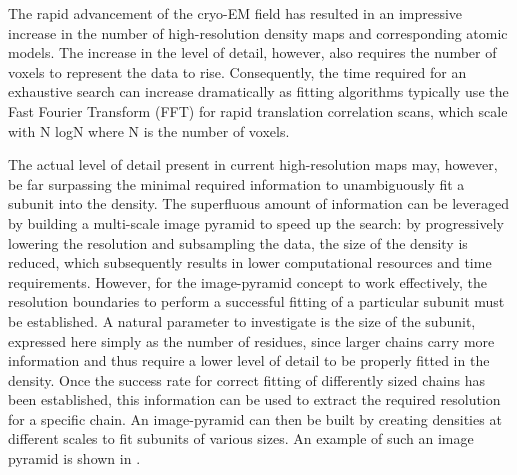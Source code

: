 The rapid advancement of the cryo-EM field has resulted in an impressive
increase in the number of high-resolution density maps and corresponding atomic
models. The increase in the level of detail, however, also requires the number
of voxels to represent the data to rise. Consequently, the time required for an
exhaustive search can increase dramatically as fitting algorithms typically use
the Fast Fourier Transform (FFT) for rapid translation correlation scans, which
scale with N log⁡N where N is the number of voxels. 

The actual level of detail present in current high-resolution maps may,
however, be far surpassing the minimal required information to unambiguously
fit a subunit into the density. The superfluous amount of information can be
leveraged by building a multi-scale image pyramid to speed up the search: by
progressively lowering the resolution and subsampling the data, the size of the
density is reduced, which subsequently results in lower computational resources
and time requirements. However, for the image-pyramid concept to work
effectively, the resolution boundaries to perform a successful fitting of a
particular subunit must be established. A natural parameter to investigate is
the size of the subunit, expressed here simply as the number of residues, since
larger chains carry more information and thus require a lower level of detail
to be properly fitted in the density. Once the success rate for correct fitting
of differently sized chains has been established, this information can be used
to extract the required resolution for a specific chain. An image-pyramid can
then be built by creating densities at different scales to fit subunits of
various sizes. An example of such an image pyramid is shown in
.

{}

